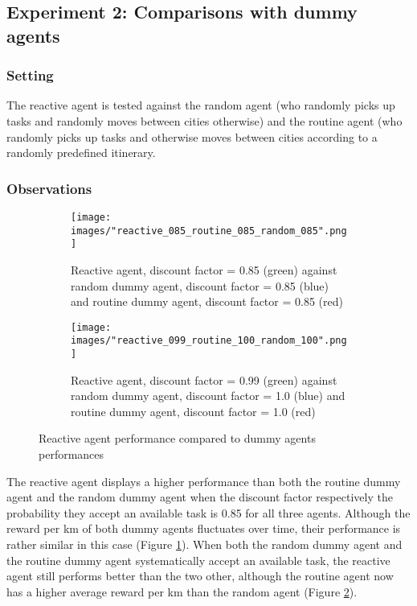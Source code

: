 \documentclass[11pt]{article}
\begin{document}
\subsection{Experiment 2: Comparisons with dummy agents}

\subsubsection{Setting}
The reactive agent is tested against the random agent (who randomly picks up tasks and randomly moves between cities otherwise) and the routine agent (who randomly picks up tasks and otherwise moves between cities according to a randomly predefined itinerary.

\subsubsection{Observations}

\begin{figure}[h!]
\centering
\begin{subfigure}[t]{0.47\textwidth}
\captionsetup{width=1.0\textwidth}
\texttt{[image: images/"reactive\_085\_routine\_085\_random\_085".png]}
\caption{Reactive agent, discount factor = 0.85 (green) against random dummy agent, discount factor = 0.85 (blue) and routine dummy agent, discount factor = 0.85 (red)}
\label{reactive vs dummies a}
\end{subfigure}
\hfill
\begin{subfigure}[t]{0.47\textwidth}
\captionsetup{width=1.0\textwidth}
\texttt{[image: images/"reactive\_099\_routine\_100\_random\_100".png]}
\caption{Reactive agent, discount factor = 0.99 (green) against random dummy agent, discount factor = 1.0 (blue) and routine dummy agent, discount factor = 1.0 (red)}
\label{reactive vs dummies b}
\end{subfigure}
\caption{Reactive agent performance compared to dummy agents performances}
\label{reactive vs dummies}
\end{figure}

The reactive agent displays a higher performance than both the routine dummy agent and the random dummy agent when the discount factor respectively the probability they accept an available task is 0.85 for all three agents.
Although the reward per km of both dummy agents fluctuates over time, their performance is rather similar in this case (Figure \ref{reactive vs dummies a}).
When both the random dummy agent and the routine dummy agent systematically accept an available task, the reactive agent still performs better than the two other, although the routine agent now has a higher average reward per km than the random agent (Figure \ref{reactive vs dummies b}).
\end{document}
